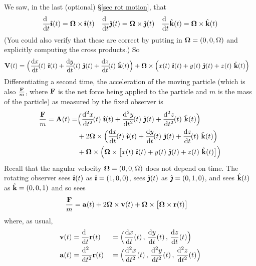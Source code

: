 We saw, in the last (optional) \S\ref{sec rot motion}, that
\begin{align*}
\diff{\hfill}{t} \hi(t)=\vOmega\times\hi(t)\quad
\diff{\hfill}{t} \hj(t)=\vOmega\times\hj(t)\quad
\diff{\hfill}{t} \hk(t)=\vOmega\times\hk(t)
\end{align*}
(You could also verify that these are correct by putting in
$\mathbf{\Omega} = (0,0,\Omega)$ and explicitly computing the cross products.)
So
\begin{align*}
\vV(t)&= \Big(\diff{x}{t}\!(t)\ \hi(t) 
                         + \diff{y}{t}\!(t)\ \hj(t) 
                         + \diff{z}{t}\!(t)\ \hk(t)\Big)
                     +\vOmega\times\Big(x(t)\ \hi(t)
                                  +y(t)\ \hj(t)
                                  +z(t)\ \hk(t)\Big)
\end{align*}
Differentiating a second time, the acceleration of the moving particle
(which is also $\frac{\mathbf{F}}{m}$, where $\mathbf{F}$ is the net force being applied
to the particle and $m$ is the mass of the particle) 
as measured  by the fixed observer is
\begin{align*}
\frac{\vF}{m}
=\vA(t)
=&  \Big(\difftwo{x}{t}\!(t)\ \hi(t) 
                         + \difftwo{y}{t}\!(t)\ \hj(t) 
                         + \difftwo{z}{t}\!(t)\ \hk(t)\Big) \\
& +2\vOmega\times\Big(\diff{x}{t}\!(t)\ \hi(t)
                                  +\diff{y}{t}\!(t)\ \hj(t)
                                  +\diff{z}{t}\!(t)\ \hk(t)\Big) \\
&+\vOmega\times\Big(\vOmega\times\big[x(t)\ \hi(t)
                                  +y(t)\ \hj(t)
                                  +z(t)\ \hk(t)\big]\Big)
\end{align*}
Recall that the angular velocity $\mathbf{\Omega}=(0,0,\Omega)$ does 
not depend on time.
The rotating observer sees $\hat{\pmb{\imath}}(t)$ as $\hat{\pmb{\imath}}=(1,0,0)$,
sees $\hat{\pmb{\jmath}}(t)$ as $\hat{\pmb{\jmath}}=(0,1,0)$, and sees $\hat{\mathbf{k}}(t)$ as $\hat{\mathbf{k}}=(0,0,1)$ and so sees
\begin{align*}
\frac{\mathbf{F}}{m}
&=\mathbf{a}(t) + 2\mathbf{\Omega}\times\mathbf{v}(t) +\mathbf{\Omega}\times\big[\mathbf{\Omega}\times\mathbf{r}(t)\big]
\end{align*}
where, as usual,
\begin{alignat*}{3}
\vv(t) &= \diff{\hfill}{t}\vr(t)
       &&= \Big(\diff{x}{t}(t)\,,\,\diff{y}{t}(t)\,,\,\diff{z}{t}(t)\Big) \\
\va(t) &= \difftwo{\hfill}{t}\vr(t)
    &&= \Big(\difftwo{x}{t}(t)\,,\,\difftwo{y}{t}(t)\,,\,\difftwo{z}{t}(t)\Big)
\end{alignat*}

